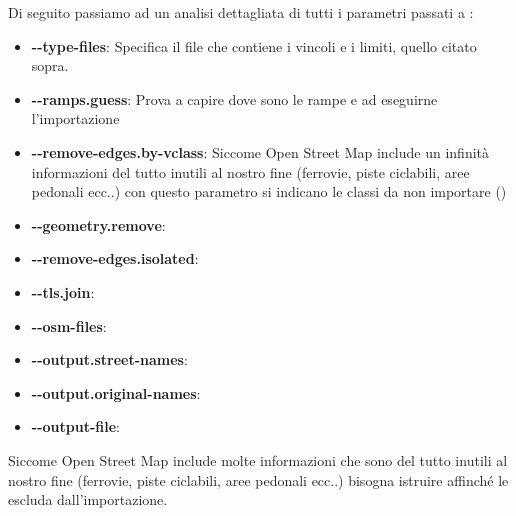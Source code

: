 Di seguito passiamo ad un analisi dettagliata di tutti i parametri passati a :

\begin{itemize}
	\item \textbf{-{}-type-files}: Specifica il file che contiene i vincoli e i limiti, quello citato sopra.
	\item \textbf{-{}-ramps.guess}: Prova a capire dove sono le rampe e ad eseguirne l'importazione
	\item \textbf{-{}-remove-edges.by-vclass}: Siccome Open Street Map include un infinità informazioni del tutto inutili al nostro fine (ferrovie, piste ciclabili, aree pedonali ecc..) con questo parametro si indicano le classi da non importare ()
	\item \textbf{-{}-geometry.remove}:
	\item \textbf{-{}-remove-edges.isolated}:
	\item \textbf{-{}-tls.join}:
	\item \textbf{-{}-osm-files}:
	\item \textbf{-{}-output.street-names}:
	\item \textbf{-{}-output.original-names}:
	\item \textbf{-{}-output-file}:
\end{itemize}

Siccome Open Street Map include molte informazioni che sono del tutto inutili al nostro fine (ferrovie, piste ciclabili, aree pedonali ecc..) bisogna istruire  affinché le escluda dall'importazione. 


